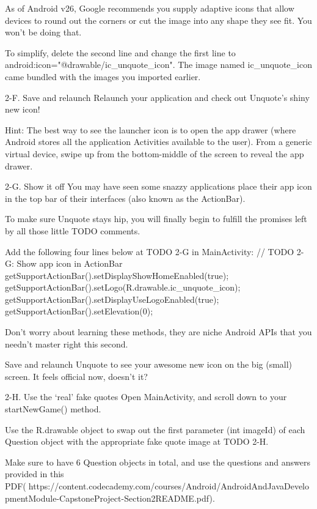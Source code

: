                 As of Android v26, Google recommends you supply adaptive icons that allow devices to round out the corners or cut the image into any shape they see fit. You won’t be doing that.

                To simplify, delete the second line and change the first line to android:icon="@drawable/ic_unquote_icon". The image named ic_unquote_icon came bundled with the images you imported earlier.

        2-F. Save and relaunch
                Relaunch your application and check out Unquote’s shiny new icon!

                Hint: The best way to see the launcher icon is to open the app drawer (where Android stores all the application Activities available to the user).
                        From a generic virtual device, swipe up from the bottom-middle of the screen to reveal the app drawer.
        
        2-G. Show it off
                You may have seen some snazzy applications place their app icon in the top bar of their interfaces (also known as the ActionBar).

                To make sure Unquote stays hip, you will finally begin to fulfill the promises left by all those little TODO comments.

                Add the following four lines below at TODO 2-G in MainActivity:
                        // TODO 2-G: Show app icon in ActionBar
                        getSupportActionBar().setDisplayShowHomeEnabled(true);
                        getSupportActionBar().setLogo(R.drawable.ic_unquote_icon);
                        getSupportActionBar().setDisplayUseLogoEnabled(true);
                        getSupportActionBar().setElevation(0);

                Don’t worry about learning these methods, they are niche Android APIs that you needn’t master right this second.

                Save and relaunch Unquote to see your awesome new icon on the big (small) screen. It feels official now, doesn’t it?

        2-H. Use the ‘real’ fake quotes
                Open MainActivity, and scroll down to your startNewGame() method.

                Use the R.drawable object to swap out the first parameter (int imageId) of each Question object with the appropriate fake quote image at TODO 2-H.

                Make sure to have 6 Question objects in total, and use the questions and answers provided in this PDF(🔗https://content.codecademy.com/courses/Android/AndroidAndJavaDevelopmentModule-CapstoneProject-Section2README.pdf).

